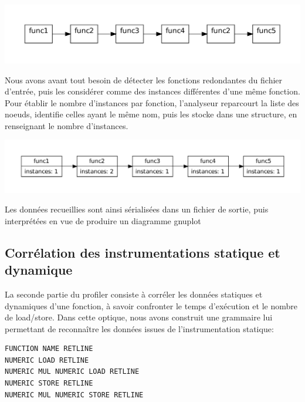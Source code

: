 \begin{center}
	\includegraphics[scale=0.50]{images/liste1}
\end{center}

Nous avons avant tout besoin de détecter les fonctions redondantes du fichier d'entrée, puis les considérer comme des instances différentes d'une même fonction.
Pour établir le nombre d'instances par fonction, l'analyseur reparcourt la liste des noeuds, identifie celles ayant le même nom, puis les stocke dans une structure, en renseignant le nombre d'instances.\\

\begin{center}
	\includegraphics[scale=0.50]{images/ListIntances}
\end{center}

Les données recueillies sont ainsi sérialisées dans un fichier de sortie, puis interprétées en vue de produire un diagramme gnuplot \\

\subsection{Corrélation des instrumentations statique et dynamique}

La seconde partie du profiler consiste à corréler les données statiques et dynamiques d'une fonction, à savoir confronter le temps d'exécution et le nombre de load/store. Dans cette optique, nous avons construit une grammaire lui permettant de reconnaître les données issues de l'instrumentation statique:

\begin{verbatim}
FUNCTION NAME RETLINE
NUMERIC LOAD RETLINE
NUMERIC MUL NUMERIC LOAD RETLINE
NUMERIC STORE RETLINE
NUMERIC MUL NUMERIC STORE RETLINE
\end{verbatim}

